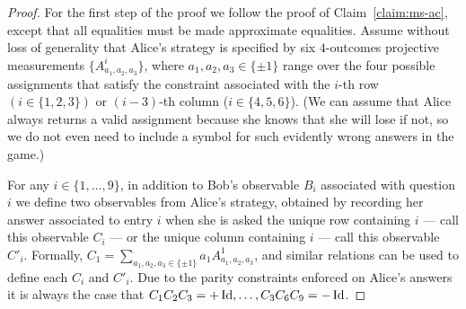 \begin{proof}
For the first step of the proof we follow the proof of Claim~\ref{claim:ms-ac}, except that all equalities must be made approximate equalities. 
Assume without loss of generality that Alice's strategy is specified by six $4$-outcomes projective measurements $\{A^i_{a_1,a_2,a_3}\}$, where $a_1,a_2,a_3\in\{\pm 1\}$ range over the four possible assignments that satisfy the constraint associated with the $i$-th row $(i\in \{1,2,3\})$ or $(i-3)$-th column ($i\in \{4,5,6\}$). (We can assume that Alice always returns a valid assignment because she knows that she will lose if not, so we do not even need to include a symbol for such evidently wrong answers in the game.)

For any $i\in\{1,\ldots,9\}$, in addition to Bob's observable $B_i$ associated with question $i$ we define two observables from Alice's strategy, obtained by recording her answer associated to entry $i$ when she is asked the unique row containing $i$ --- call this observable $C_i$ --- or the unique column containing $i$ --- call this observable $C'_i$. Formally, $C_1 = \sum_{a_1,a_2,a_3\in\{\pm 1\}}a_1 A^1_{a_1,a_2,a_3}$, and similar relations can be used to define each $C_i$ and $C'_i$. Due to the parity constraints enforced on Alice's answers it is always the case that $C_1C_2C_3=+\mathop{\rm Id}\nolimits,\ldots,C_3C_6C_9=-\mathop{\rm Id}\nolimits$.
 

\end{proof}
